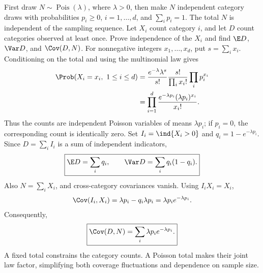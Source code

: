First draw $N\sim\operatorname{Pois}(\lambda)$, where $\lambda>0$, then make $N$ independent category draws with probabilities $p_i\ge0$, $i=1,\ldots,d$, and $\sum_i p_i=1$. The total $N$ is independent of the sampling sequence. Let $X_i$ count category $i$, and let $D$ count categories observed at least once. Prove independence of the $X_i$ and find $\E D$, $\Var D$, and $\Cov(D,N)$.
\solution For nonnegative integers $x_1,\ldots,x_d$, put $s=\sum_i x_i$. Conditioning on the total and using the multinomial law gives
\[
\begin{aligned}
\Prob(X_i=x_i,\ 1\le i\le d)
&=\frac{e^{-\lambda}\lambda^s}{s!}
\frac{s!}{\prod_i x_i!}\prod_i p_i^{x_i}\\
&=\prod_{i=1}^d\frac{e^{-\lambda p_i}(\lambda p_i)^{x_i}}{x_i!}.
\end{aligned}
\]
Thus the counts are independent Poisson variables of means $\lambda p_i$; if $p_i=0$, the corresponding count is identically zero. Set $I_i=\ind\{X_i>0\}$ and $q_i=1-e^{-\lambda p_i}$. Since $D=\sum_i I_i$ is a sum of independent indicators,
\[
\boxed{\E D=\sum_i q_i,\qquad \Var D=\sum_i q_i(1-q_i).}
\]
Also $N=\sum_i X_i$, and cross-category covariances vanish. Using $I_iX_i=X_i$,
\[
\Cov(I_i,X_i)=\lambda p_i-q_i\lambda p_i
=\lambda p_i e^{-\lambda p_i}.
\]
Consequently,
\[
\boxed{\Cov(D,N)=\sum_i\lambda p_i e^{-\lambda p_i}.}
\]
\insight A fixed total constrains the category counts. A Poisson total makes their joint law factor, simplifying both coverage fluctuations and dependence on sample size.
